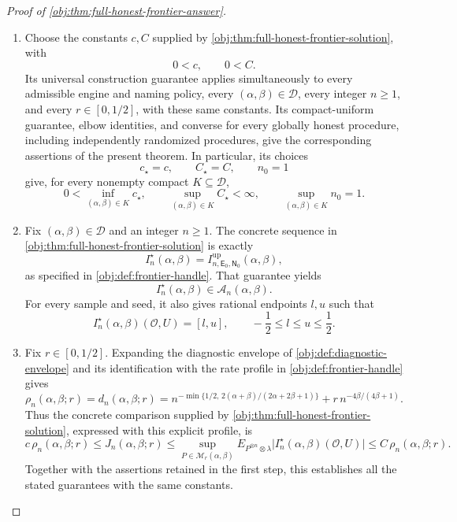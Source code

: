 \begin{proof}[Proof of \cref{obj:thm:full-honest-frontier-answer}]
\begin{enumerate}
\item Choose the constants \(c,C\) supplied by
\cref{obj:thm:full-honest-frontier-solution}, with
\[
0<c,\qquad 0<C.
\]
Its universal construction guarantee applies simultaneously to every admissible engine and naming policy, every \((\alpha,\beta)\in\mathcal D\), every integer \(n\ge1\), and every \(r\in[0,1/2]\), with these same constants. Its compact-uniform guarantee, elbow identities, and converse for every globally honest procedure, including independently randomized procedures, give the corresponding assertions of the present theorem. In particular, its choices
\[
c_\star=c,\qquad C_\star=C,\qquad n_0=1
\]
give, for every nonempty compact \(K\subseteq\mathcal D\),
\[
0<\inf_{(\alpha,\beta)\in K}c_\star,\qquad
\sup_{(\alpha,\beta)\in K}C_\star<\infty,\qquad
\sup_{(\alpha,\beta)\in K}n_0=1.
\]

\item Fix \((\alpha,\beta)\in\mathcal D\) and an integer \(n\ge1\). The concrete sequence in
\cref{obj:thm:full-honest-frontier-solution} is exactly
\[
I_n^\star(\alpha,\beta)
=I^{\mathrm{up}}_{n,\mathsf E_0,\mathsf N_0}(\alpha,\beta),
\]
as specified in \cref{obj:def:frontier-handle}. That guarantee yields
\[
I_n^\star(\alpha,\beta)\in\mathcal A_n(\alpha,\beta).
\]
For every sample and seed, it also gives rational endpoints \(l,u\) such that
\[
I_n^\star(\alpha,\beta)(\mathcal O,U)=[l,u],
\qquad
-\frac12\le l\le u\le\frac12.
\]

\item Fix \(r\in[0,1/2]\). Expanding the diagnostic envelope of
\cref{obj:def:diagnostic-envelope} and its identification with the rate profile in
\cref{obj:def:frontier-handle} gives
\[
\rho_n(\alpha,\beta;r)=d_n(\alpha,\beta;r)
=
n^{-\min\{1/2,\,2(\alpha+\beta)/(2\alpha+2\beta+1)\}}
+r\,n^{-4\beta/(4\beta+1)}.
\]
Thus the concrete comparison supplied by
\cref{obj:thm:full-honest-frontier-solution}, expressed with this explicit profile, is
\[
c\,\rho_n(\alpha,\beta;r)
\le J_n(\alpha,\beta;r)
\le
\sup_{P\in\mathcal M_r(\alpha,\beta)}
E_{P^{\otimes n}\otimes\lambda}
\bigl|I_n^\star(\alpha,\beta)(\mathcal O,U)\bigr|
\le C\,\rho_n(\alpha,\beta;r).
\]
Together with the assertions retained in the first step, this establishes all the stated guarantees with the same constants.
\end{enumerate}
\end{proof}

